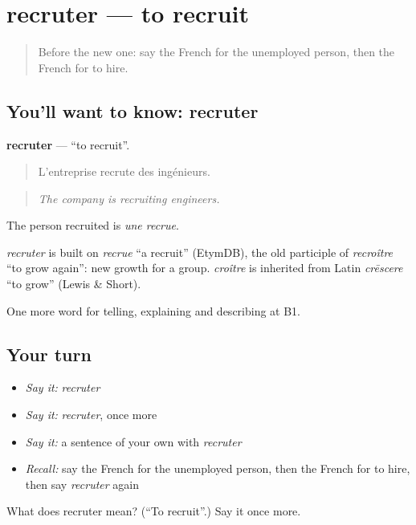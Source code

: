 \section[recruter]{recruter — to recruit}

\label{lesson:FR-C356-recruter}



\begin{quote}
Before the new one: say the French for the unemployed person, then the French for to hire.
\end{quote}

\subsection*{You'll want to know: recruter}
\textbf{recruter} — \textquotedblleft{}to recruit\textquotedblright{}.

\begin{quote}
L'entreprise recrute des ingénieurs.
\end{quote}

\begin{quote}
\emph{The company is recruiting engineers.}
\end{quote}

The person recruited is \emph{une recrue}.

\begin{cousinweb}
\emph{recruter} is built on \emph{recrue} \textquotedblleft{}a recruit\textquotedblright{} (EtymDB), the old participle of \emph{recroître} \textquotedblleft{}to grow again\textquotedblright{}: new growth for a group. \emph{croître} is inherited from Latin \emph{crēscere} \textquotedblleft{}to grow\textquotedblright{} (Lewis \& Short).
\end{cousinweb}

\begin{grammarlens}[title={What you've built}]
One more word for telling, explaining and describing at B1.
\end{grammarlens}

\subsection*{Your turn}
\begin{itemize}
\raggedright
  \item \emph{Say it:} \emph{recruter}
  \item \emph{Say it:} \emph{recruter}, once more
  \item \emph{Say it:} a sentence of your own with \emph{recruter}
  \item \emph{Recall:} say the French for the unemployed person, then the French for to hire, then say \emph{recruter} again
\end{itemize}

\begin{tcolorbox}[breakable,colback=teal!4,colframe=teal!35!black,title={Before you move on}]
What does recruter mean? (\textquotedblleft{}To recruit\textquotedblright{}.) Say it once more.
\end{tcolorbox}
